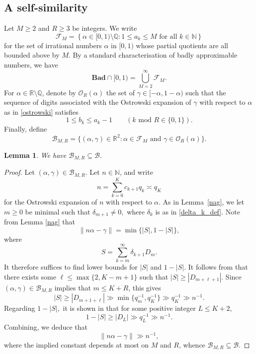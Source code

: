 \documentclass[12pt, reqno]{amsart}
\newtheorem{lemma}[thm]{Lemma}
\theoremstyle{definition}
\theoremstyle{remark}
\numberwithin{equation}{section}
\newcommand{\mmod}[1]{\,\,\mathrm{mod}\,\,#1}
\def\alp{{\alpha}} \def\bfalp{{\boldsymbol \alpha}}
\def\gam{{\gamma}} \def\Gam{{\Gamma}}
\def\del{{\delta}} \def\Del{{\Delta}}
\def\le{\leqslant} \def\ge{\geqslant}
\def\ls{\leqslant} \def\gs{\geqslant}
\def \bN {\mathbb N}
\def \bQ {\mathbb Q}
\def \bR {\mathbb R}
\def \cB {\mathcal B}
\def \cF {\mathcal F}
\def \cO {\mathcal O}
\def \Bad {{\mathrm{\mathbf{Bad}}}}
\begin{document}
\subsection{A self-similarity}

Let $M \ge 2$ and $R \ge 3$ be integers. We write 
\[
\cF_M = \left\{\alp \in [0,1)\setminus \bQ : 1\ls a_k \ls M \text{ for all }  
k \in \bN \right\}  
\]
for the set of irrational numbers $\alp$ in $[0,1)$ whose partial quotients are all bounded above by $M$. By a standard characterisation of badly approximable numbers, we have
\[ 
\Bad \cap [0,1) = \bigcup_{M=2}^\infty \cF_M. 
\]
For $\alp \in \bR \setminus \bQ$, denote by $\cO_{R}(\alp)$
the set of $\gam \in [-\alp,1-\alp)$ such that the sequence of digits associated with the Ostrowski expansion of $\gam$ with respect to $\alp$ as in \eqref{ostrowski} satisfies
\begin{equation}
\label{PeriodicConstraint} 
1 \le b_k \le a_k-1
\qquad (k \mmod R \in \{0,1\}).
\end{equation}
Finally, define
\[
\cB_{M,R} = \{ (\alp, \gam) \in \bR^2: \alp \in \cF_M \text{ and } \gam \in \cO_{R}(\alp) \}.
\]

\begin{lemma} We have $\cB_{M,R} \subseteq \cB$.
\end{lemma}

\begin{proof} Let $(\alp,\gam) \in \cB_{M,R}$. Let $n\in \bN$, and write
\[
n = \sum_{k=0}^K c_{k+1} q_k
\asymp q_K 
\]
for the Ostrowski expansion of $n$ with respect to $\alp$. As in Lemma~\ref{nag}, we let $m \gs 0$ be minimal such that $\del_{m+1} \ne 0,$ where $\del_k$ is as in \eqref{delta_k_def}. Note from Lemma \ref{nag} that 
\[
\| n \alp - \gam \| = \min \{ |S|, 1-|S| \},
\]
where
\[
S = \sum_{k=m}^\infty \del_{k+1} D_m.
\]
It therefore suffices to find lower bounds for $|S|$ and $1-|S|$. It follows from \cite[Lemma 4.4]{BHV} that there exists some 
$\ell \ls \max\{2, K-m + 1\}$ such that $|S| \gs |D_{m+\ell +1}|.$ Since $(\alp,\gam) \in \cB_{M,R}$ implies that $m \le K + R$, this gives
\[
|S| \ge |D_{m+1+\ell}| \gg 
\min \{ q_m^{-1}, q_K^{-1} \}
\gg q_K^{-1} \gg n^{-1}. 
\]
Regarding $1-|S|,$ it is shown in \cite[Lemma 4.5]{BHV} that for some positive integer $L \le K+2$, 
\[ 
1 - |S| \gs |D_L| \gg q_L^{-1} \gg  n^{-1}.
\]
Combining, we deduce that 
\[
\| n \alp - \gam \| \gg n^{-1},
\]
where the implied constant depends at most on $M$ and $R$, whence  $\cB_{M,R} \subseteq \cB$.
\end{proof}
\end{document}
